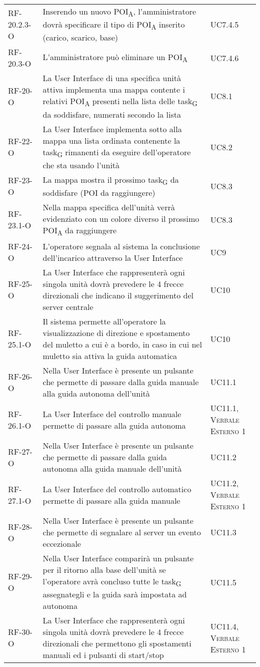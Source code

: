 \begin{longtable}{ 
		>{}p{} 
		>{}p{}
		>{\centering}p{} }
RF-20.2.3-O	&	Inserendo un nuovo POI\textsubscript{A}, l'amministratore dovrà specificare il tipo di \acrshort{POI}\textsubscript{A} inserito (carico, scarico, base)	&	UC7.4.5\tabularnewline
RF-20.3-O		&	L'amministratore può eliminare un \acrshort{POI}\textsubscript{A}	&	UC7.4.6\tabularnewline
RF-20-O		&	La User Interface di una specifica unità attiva implementa una mappa contente i relativi \acrshort{POI}\textsubscript{A} presenti nella lista delle \gls{task}\textsubscript{G} da soddisfare, numerati secondo la lista	&	UC8.1\tabularnewline
RF-22-O		&	La User Interface implementa sotto alla mappa una lista ordinata contenente la \gls{task}\textsubscript{G} rimanenti da eseguire dell'operatore che sta usando l'unità	&	UC8.2\tabularnewline
RF-23-O		&	La mappa mostra il prossimo \gls{task}\textsubscript{G} da soddisfare (POI da raggiungere) 	&	UC8.3\tabularnewline
RF-23.1-O		&	Nella mappa specifica dell'unità verrà evidenziato con un colore diverso il prossimo \acrshort{POI}\textsubscript{A} da raggiungere	&	UC8.3\tabularnewline
RF-24-O		&	L'operatore segnala al sistema la conclusione dell'incarico attraverso la User Interface	&	UC9\tabularnewline				
RF-25-O		&	La User Interface che rappresenterà ogni singola unità dovrà prevedere le 4 frecce direzionali che indicano il suggerimento del server centrale	&	UC10\tabularnewline
RF-25.1-O		&	Il sistema permette all'operatore la visualizzazione di direzione e spostamento del muletto a cui è a bordo, in caso in cui nel muletto sia attiva la guida automatica 	&	UC10\tabularnewline				
RF-26-O		&	Nella User Interface è presente un pulsante che permette di passare dalla guida manuale alla guida autonoma dell'unità	&	UC11.1\tabularnewline
RF-26.1-O		&	La User Interface del controllo manuale permette di passare alla guida autonoma	&	UC11.1, \textsc{\textsc{Verbale Esterno 1}}\tabularnewline
RF-27-O		&	Nella User Interface è presente un pulsante che permette di passare dalla guida autonoma alla guida manuale dell'unità	&	UC11.2\tabularnewline
RF-27.1-O		&	La User Interface del controllo automatico permette di passare alla guida manuale	&	UC11.2, \textsc{\textsc{Verbale Esterno 1}}\tabularnewline
RF-28-O		&	Nella User Interface è presente un pulsante che permette di segnalare al server un evento eccezionale	&	UC11.3\tabularnewline
RF-29-O		&	Nella User Interface comparirà  un pulsante per il ritorno alla base dell'unità se l'operatore avrà concluso tutte le \gls{task}\textsubscript{G} assegnategli e la guida sarà impostata ad autonoma 	&	UC11.5\tabularnewline 
RF-30-O		&	La User Interface che rappresenterà ogni singola unità dovrà prevedere le 4 frecce direzionali che permettono gli spostamenti manuali ed i pulsanti di start/stop	&	UC11.4, \textsc{\textsc{Verbale Esterno 1}}\tabularnewline

\end{longtable}

